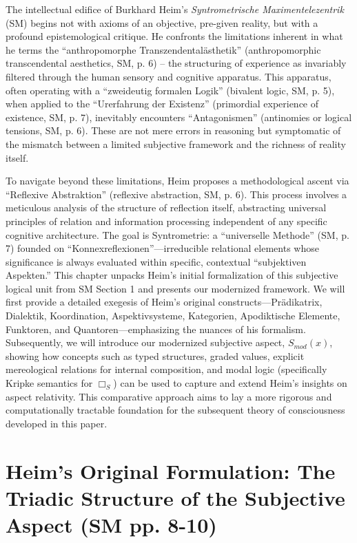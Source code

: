 \documentclass[
    12pt,              %
    a4paper,           %
    headings=normal,   %
    twoside=true,      %
    BCOR=8mm,          %
]{scrbook}
\newcommand{\q}[1]{\enquote{#1}}
\newcommand{\subjektiveraspekt}{S}
\begin{document}
The intellectual edifice of Burkhard Heim’s \textit{Syntrometrische Maximentelezentrik} (SM) begins not with axioms of an objective, pre-given reality, but with a profound epistemological critique. He confronts the limitations inherent in what he terms the \q{anthropomorphe Transzendentalästhetik} (anthropomorphic transcendental aesthetics, SM, p. 6) – the structuring of experience as invariably filtered through the human sensory and cognitive apparatus. This apparatus, often operating with a \q{zweideutig formalen Logik} (bivalent logic, SM, p. 5), when applied to the \q{Urerfahrung der Existenz} (primordial experience of existence, SM, p. 7), inevitably encounters \q{Antagonismen} (antinomies or logical tensions, SM, p. 6). These are not mere errors in reasoning but symptomatic of the mismatch between a limited subjective framework and the richness of reality itself.

To navigate beyond these limitations, Heim proposes a methodological ascent via \q{Reflexive Abstraktion} (reflexive abstraction, SM, p. 6). This process involves a meticulous analysis of the structure of reflection itself, abstracting universal principles of relation and information processing independent of any specific cognitive architecture. The goal is Syntrometrie: a \q{universelle Methode} (SM, p. 7) founded on \q{Konnexreflexionen}—irreducible relational elements whose significance is always evaluated within specific, contextual \q{subjektiven Aspekten.} This chapter unpacks Heim's initial formalization of this subjective logical unit from SM Section 1 and presents our modernized framework. We will first provide a detailed exegesis of Heim's original constructs—Prädikatrix, Dialektik, Koordination, Aspektivsysteme, Kategorien, Apodiktische Elemente, Funktoren, and Quantoren—emphasizing the nuances of his formalism. Subsequently, we will introduce our modernized subjective aspect, \(S_{mod}(x)\), showing how concepts such as typed structures, graded values, explicit mereological relations for internal composition, and modal logic (specifically Kripke semantics for \(\Box_{\subjektiveraspekt}\)) can be used to capture and extend Heim's insights on aspect relativity. This comparative approach aims to lay a more rigorous and computationally tractable foundation for the subsequent theory of consciousness developed in this paper.

\section{Heim's Original Formulation: The Triadic Structure of the Subjective Aspect (SM pp. 8-10)}
\label{sec:ch1_heim_original_formulation}
\end{document}

